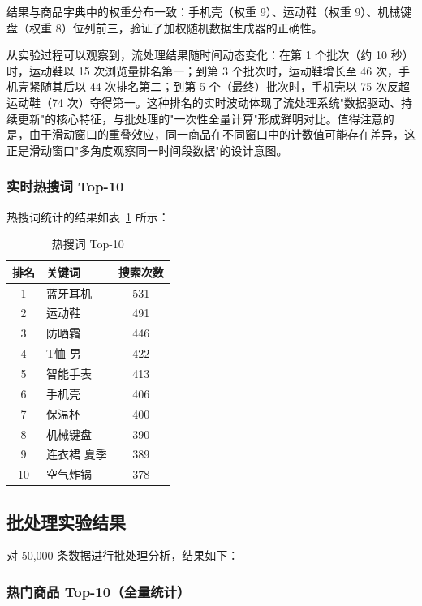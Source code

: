 \documentclass[12pt,a4paper]{article}
\begin{document}
结果与商品字典中的权重分布一致：手机壳（权重 9）、运动鞋（权重 9）、机械键盘（权重 8）位列前三，验证了加权随机数据生成器的正确性。

从实验过程可以观察到，流处理结果随时间动态变化：在第 1 个批次（约 10 秒）时，运动鞋以 15 次浏览量排名第一；到第 3 个批次时，运动鞋增长至 46 次，手机壳紧随其后以 44 次排名第二；到第 5 个（最终）批次时，手机壳以 75 次反超运动鞋（74 次）夺得第一。这种排名的实时波动体现了流处理系统"数据驱动、持续更新"的核心特征，与批处理的"一次性全量计算"形成鲜明对比。值得注意的是，由于滑动窗口的重叠效应，同一商品在不同窗口中的计数值可能存在差异，这正是滑动窗口"多角度观察同一时间段数据"的设计意图。

\subsubsection{实时热搜词 Top-10}

热搜词统计的结果如表~\ref{tab:hot-keywords} 所示：

\begin{table}[H]
\centering
\caption{热搜词 Top-10}
\label{tab:hot-keywords}
\begin{tabular}{clc}
\toprule
\textbf{排名} & \textbf{关键词} & \textbf{搜索次数} \\
\midrule
1 & 蓝牙耳机 & 531 \\
2 & 运动鞋 & 491 \\
3 & 防晒霜 & 446 \\
4 & T恤 男 & 422 \\
5 & 智能手表 & 413 \\
6 & 手机壳 & 406 \\
7 & 保温杯 & 400 \\
8 & 机械键盘 & 390 \\
9 & 连衣裙 夏季 & 389 \\
10 & 空气炸锅 & 378 \\
\bottomrule
\end{tabular}
\end{table}

\subsection{批处理实验结果}

对 50,000 条数据进行批处理分析，结果如下：

\subsubsection{热门商品 Top-10（全量统计）}
\end{document}

